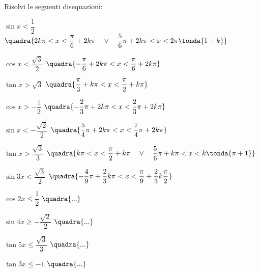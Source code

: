 \begin{esercizio}\label{ese:03.1}
Risolvi le seguenti disequazioni:
 \begin{enumeratea}
  \item $\sin x < \dfrac{1}{2}$
   \hfill$\quadra{2 k \pi < x < \dfrac{\pi}{6} + 2 k \pi \quad \vee \quad 
                  \dfrac{5}{6}\pi + 2 k \pi < x < 2 \pi \tonda{1 + k}}$
  \item $\cos x < \dfrac{\sqrt{3}}{2}$
   \hfill$\quadra{-\dfrac{\pi}{6} + 2 k \pi < x < \dfrac{\pi}{6} + 2 k \pi}$
  \item $\tan x > \sqrt{3}$
   \hfill$\quadra{\dfrac{\pi}{3} + k \pi < x < \dfrac{\pi}{2} + k \pi}$
  \item $\cos x > - \dfrac{1}{2}$
   \hfill$\quadra{-\dfrac{2}{3}\pi + 2 k \pi < x < \dfrac{2}{3} \pi + 2 k \pi}$
  \item $\sin x < - \dfrac{\sqrt{2}}{2}$
   \hfill$\quadra{\dfrac{5}{4}\pi + 2 k \pi < x < \dfrac{7}{4} \pi + 2 k \pi}$
  \item $\tan x > \dfrac{\sqrt{3}}{3}$
   \hfill$\quadra{k \pi < x < \dfrac{\pi}{2} + k \pi \quad \vee \quad 
                  \dfrac{5}{6}\pi + k \pi < x < k \tonda{\pi + 1}}$
  \item $\sin 3 x < \dfrac{\sqrt{3}}{2}$
   \hfill$\quadra{- \dfrac{4}{9} \pi +\dfrac{2}{3} k \pi < x < 
                    \dfrac{\pi}{9} + \dfrac{2}{3} k \dfrac{\pi}{2}}$
  \item $\cos 2 x \leqslant \dfrac{1}{2}$
   \hfill$\quadra{...}$
  \item $\sin 4 x \geqslant - \dfrac{\sqrt{2}}{2}$
   \hfill$\quadra{...}$
  \item $\tan 5 x \leqslant \dfrac{\sqrt{3}}{3}$
   \hfill$\quadra{...}$
  \item $\tan 3 x \leqslant -1 $
   \hfill$\quadra{...}$
 \end{enumeratea}
\end{esercizio}
% 
% 
% 
% 
% 
